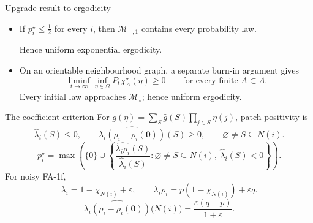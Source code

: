 \documentclass[t,aspectratio=169,11pt]{beamer}
\newcommand{\Mstar}{\mathcal M_\star}
\newenvironment{talkpoints}{\begin{itemize}\setlength{\itemsep}{.65em}}{\end{itemize}}
\begin{document}
\begin{frame}[label=proof-ergodicity]{Upgrade result to ergodicity}
\begin{talkpoints}
\item If $p_i^\star\leq\tfrac12$ for every $i$, then $\mathcal M_{-,1}$ contains every probability law.
\par\medskip
Hence uniform exponential ergodicity.
\item On an orientable neighbourhood graph, a separate burn-in argument gives
\begin{equation*}
\liminf_{t\to\infty}\inf_{\eta\in\Omega}P_t\chi_A^\star(\eta)\geq0
\qquad\text{for every finite }A\subset\Lambda.
\end{equation*}
Every initial law approaches $\Mstar$; hence uniform ergodicity.
\end{talkpoints}
\note{\ProofErgodicityScript}
\end{frame}

\appendix
{}

\begin{frame}[noframenumbering]{The coefficient criterion}
For $g(\eta)=\sum_S\widehat g(S)\prod_{j\in S}\eta(j)$, patch positivity is
\begin{equation*}
\widehat\lambda_i(S)\leq0,
\qquad
\widehat{\lambda_i(\rho_i-\rho_i(\mathbf0))}(S)\geq0,
\qquad \varnothing\neq S\subseteq N(i).
\end{equation*}
\begin{equation*}
p_i^\star
=\max\!\left(\{0\}\cup
\left\{\frac{\widehat{\lambda_i\rho_i}(S)}{\widehat\lambda_i(S)}:
\varnothing\neq S\subseteq N(i),\ \widehat\lambda_i(S)<0\right\}\right).
\end{equation*}
\medskip
For noisy FA-1f,
\begin{equation*}
\lambda_i=1-\chi_{N(i)}+\varepsilon,\qquad
\lambda_i\rho_i=p(1-\chi_{N(i)})+\varepsilon q.
\end{equation*}
\begin{equation*}
\widehat{\lambda_i(\rho_i-\rho_i(\mathbf0))}\bigl(N(i)\bigr)
=\frac{\varepsilon(q-p)}{1+\varepsilon}.
\end{equation*}
\end{frame}
\end{document}
